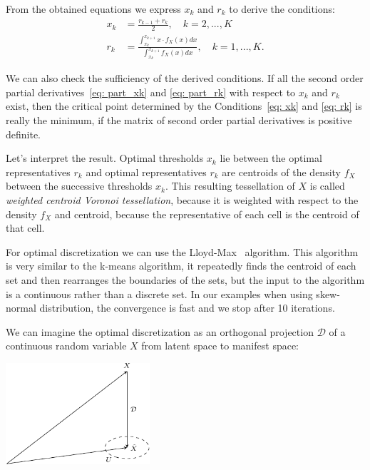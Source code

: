 \documentclass[10pt]{article}
\begin{document}
From the obtained equations we express $x_{k}$ and $r_{k}$ to derive the conditions:
\begin{align} 
x_{k} &= \frac{r_{k-1} + r_{k}}{2}, \quad k = 2, ..., K \label{eq: xk} \\
r_{k} &= \frac{ \int_{x_{k}}^{x_{k+1}} x \cdot f_{X}(x) dx }{ \int_{x_{k}}^{x_{k+1}} f_{X}(x) dx }, \quad k = 1,...,K. \label{eq: rk}
\end{align}

We can also check the sufficiency of the derived conditions. If all the second order partial derivatives~\ref{eq: part_xk} and \ref{eq: part_rk} with respect to $x_{k}$ and $r_{k}$ exist, then the critical point determined by the Conditions~\ref{eq: xk} and \ref{eq: rk} is really the minimum, if the matrix of second order  partial derivatives is positive definite.

Let's interpret the result. Optimal thresholds $x_{k}$ lie between the optimal representatives $r_{k}$ and optimal representatives $r_{k}$ are centroids of the density $f_{X}$ between the successive thresholds $x_{k}$. This resulting tessellation of $X$ is called {\it weighted centroid Voronoi tessellation}, because it is weighted with respect to the density $f_{X}$ and centroid, because the representative of each cell is the centroid of that cell. 


For optimal discretization we can use the Lloyd-Max~\cite{Max} algorithm. This algorithm is very similar to the k-means algorithm, it repeatedly finds the centroid of each set and then rearranges the boundaries of the sets, but the input to the algorithm is a continuous rather than a discrete set. In our examples when using skew-normal distribution, the convergence is fast and we stop after 10 iterations. 

We can imagine the optimal discretization as an orthogonal projection $\mathcal{D}$ of a continuous random variable $X$ from latent space to manifest space:

\begin{center}
\includegraphics[width=0.4\textwidth]{projection-cropped.pdf}
\end{center}
\end{document}
